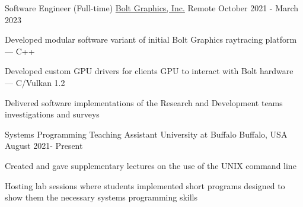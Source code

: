 

\begin{cventries}

  \cventry
    {Software Engineer (Full-time)} %
    {\href{https://www.bolt.graphics/}{Bolt Graphics, Inc.} } %
    {Remote} %
    {October 2021 - March 2023} %
    {
      \begin{cvitems} %
        \item Developed modular software variant of initial Bolt Graphics raytracing platform --- C++
        \item Developed custom GPU drivers for clients GPU to interact with Bolt hardware --- C/Vulkan 1.2
        \item Delivered software implementations of the Research and Development teams investigations and surveys
      \end{cvitems}
    }
  \cventry
    {Systems Programming Teaching Assistant} %
    {University at Buffalo} %
    {Buffalo, USA} %
    {August 2021- Present} %
    {
      \begin{cvitems} %
        \item Created and gave supplementary lectures on the use of the UNIX command line
        \item Hosting lab sessions where students implemented short programs designed to show them the necessary systems programming skills
      \end{cvitems}
    }

\end{cventries}
